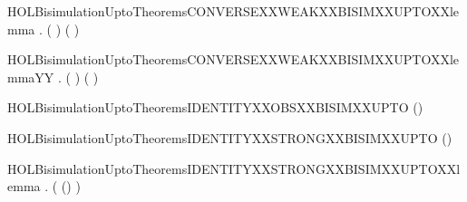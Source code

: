 \newcommand{\HOLBisimulationUptoTheoremsCONVERSEXXWEAKXXBISIMXXUPTO}{\UseVerbatim{HOLBisimulationUptoTheoremsCONVERSEXXWEAKXXBISIMXXUPTO}}
\begin{SaveVerbatim}{HOLBisimulationUptoTheoremsCONVERSEXXWEAKXXBISIMXXUPTOXXlemma}
\HOLTokenTurnstile{} \HOLSymConst{\HOLTokenForall{}}  .
       (     )   \HOLSymConst{\HOLTokenEquiv{}}
       (    )  
\end{SaveVerbatim}
\newcommand{\HOLBisimulationUptoTheoremsCONVERSEXXWEAKXXBISIMXXUPTOXXlemma}{\UseVerbatim{HOLBisimulationUptoTheoremsCONVERSEXXWEAKXXBISIMXXUPTOXXlemma}}
\begin{SaveVerbatim}{HOLBisimulationUptoTheoremsCONVERSEXXWEAKXXBISIMXXUPTOXXlemmaYY}
\HOLTokenTurnstile{} \HOLSymConst{\HOLTokenForall{}}  .
       (     )   \HOLSymConst{\HOLTokenEquiv{}}
       (    )  
\end{SaveVerbatim}
\newcommand{\HOLBisimulationUptoTheoremsCONVERSEXXWEAKXXBISIMXXUPTOXXlemmaYY}{\UseVerbatim{HOLBisimulationUptoTheoremsCONVERSEXXWEAKXXBISIMXXUPTOXXlemmaYY}}
\begin{SaveVerbatim}{HOLBisimulationUptoTheoremsIDENTITYXXOBSXXBISIMXXUPTO}
\HOLTokenTurnstile{}  (\HOLSymConst{=})
\end{SaveVerbatim}
\newcommand{\HOLBisimulationUptoTheoremsIDENTITYXXOBSXXBISIMXXUPTO}{\UseVerbatim{HOLBisimulationUptoTheoremsIDENTITYXXOBSXXBISIMXXUPTO}}
\begin{SaveVerbatim}{HOLBisimulationUptoTheoremsIDENTITYXXSTRONGXXBISIMXXUPTO}
\HOLTokenTurnstile{}  (\HOLSymConst{=})
\end{SaveVerbatim}
\newcommand{\HOLBisimulationUptoTheoremsIDENTITYXXSTRONGXXBISIMXXUPTO}{\UseVerbatim{HOLBisimulationUptoTheoremsIDENTITYXXSTRONGXXBISIMXXUPTO}}
\begin{SaveVerbatim}{HOLBisimulationUptoTheoremsIDENTITYXXSTRONGXXBISIMXXUPTOXXlemma}
\HOLTokenTurnstile{} \HOLSymConst{\HOLTokenForall{}}. (  (\HOLSymConst{=})  )  
\end{SaveVerbatim}
